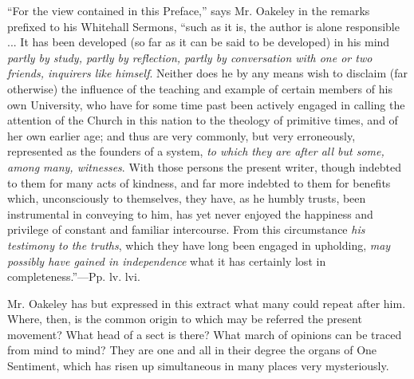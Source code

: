 ``For
the view contained in this Preface,'' says Mr. Oakeley in the remarks
prefixed to his Whitehall Sermons, ``such as it is, the author is alone
responsible ... It has been developed (so far as it can be said to be
developed) in his mind \emph{partly by study, partly by reflection,
partly by conversation with one or two friends, inquirers like himself}.
Neither does he by any means wish to disclaim (far otherwise) the
influence of the teaching and example of certain members of his own
University, who have for some time past been actively engaged in
calling the attention of the Church in this nation to the theology of
primitive times, and of her own earlier age; and thus are very
commonly, but very erroneously, represented as the founders of a
system, \emph{to which they are after all but some, among many, witnesses}.
With those persons the present writer, though indebted to them for
many acts of kindness, and far more indebted to them for benefits
which, unconsciously to themselves, they have, as he humbly trusts,
been instrumental in conveying to him, has yet never enjoyed the
happiness and privilege of constant and familiar intercourse. From
this circumstance \emph{his testimony to the truths}, which they have
long been engaged in upholding, \emph{may possibly have gained in
independence} what it has certainly lost in completeness.''—Pp. lv.
lvi.

Mr. Oakeley has but expressed in this extract
what many could repeat after him. Where, then, is the common origin to which may be referred the present movement? What head of a
sect is there? What march of opinions can be traced from mind to mind?
They are one and all in their degree the organs of One Sentiment,
which has risen up simultaneous in many places very mysteriously.

